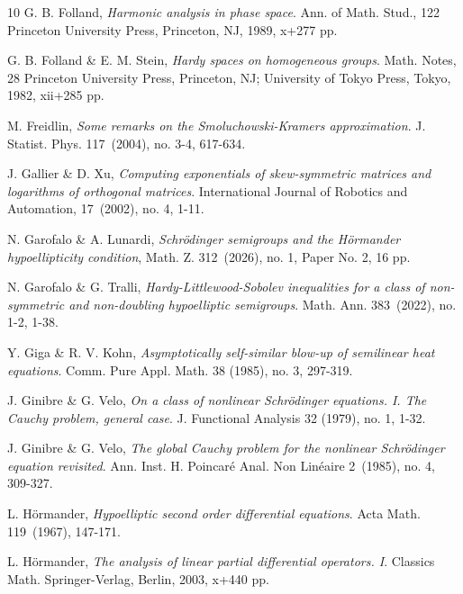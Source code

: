 \documentclass[11pt,letter]{amsart}
\numberwithin{equation}{section}
\numberwithin{equation}{section}
\begin{document}
\begin{thebibliography}{10}
G. B. Folland, \emph{Harmonic analysis in phase space}.
Ann. of Math. Stud., 122
Princeton University Press, Princeton, NJ, 1989, x+277 pp.


G. B. Folland \& E. M. Stein, \emph{Hardy spaces on homogeneous groups}.
Math. Notes, 28
Princeton University Press, Princeton, NJ; University of Tokyo Press, Tokyo, 1982, xii+285 pp.

M. Freidlin, \emph{Some remarks on the Smoluchowski-Kramers approximation}. J. Statist. Phys. 117~(2004), no. 3-4, 617-634.

J. Gallier \& D. Xu, \emph{Computing exponentials of skew-symmetric matrices and logarithms of orthogonal matrices}. International Journal of Robotics and Automation, 17~(2002), no. 4, 1-11. 


N. Garofalo \& A. Lunardi, \emph{Schr\"odinger semigroups and the H\"ormander hypoellipticity condition}, Math. Z. 312~(2026), no. 1, Paper No. 2, 16 pp.   

N. Garofalo \& G. Tralli, \emph{Hardy-Littlewood-Sobolev inequalities for a class of non-symmetric and non-doubling hypoelliptic semigroups}.
Math. Ann. 383~(2022), no. 1-2, 1-38.

Y. Giga \& R. V. Kohn, \emph{
 Asymptotically self-similar blow-up of semilinear heat equations}.
Comm. Pure Appl. Math. 38 (1985), no. 3, 297-319.



J. Ginibre \& G. Velo, \emph{On a class of nonlinear Schr\"odinger equations. I. The Cauchy problem, general case}.
J. Functional Analysis 32 (1979), no. 1, 1-32.

J. Ginibre \& G. Velo, \emph{The global Cauchy problem for the nonlinear Schr\"odinger equation revisited}.
Ann. Inst. H. Poincar\'e Anal. Non Lin\'eaire 2~(1985), no. 4, 309-327.





L. H{\"o}rmander,
\textit{Hypoelliptic second order differential equations}. Acta Math. 119~(1967), 147-171.

L. H{\"o}rmander,
\textit{The analysis of linear partial differential operators. I}.
Classics Math.
Springer-Verlag, Berlin, 2003, x+440 pp.


\end{thebibliography}
\end{document}
